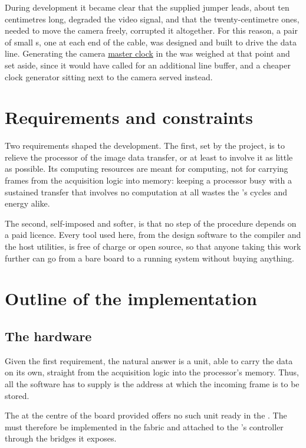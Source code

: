 During development it became clear that the supplied jumper leads, about ten centimetres long, degraded the video signal, and that the twenty-centimetre ones, needed to move the camera freely, corrupted it altogether. For this reason, a pair of small s, one at each end of the cable, was designed and built to drive the data line. Generating the camera \uline{master clock} in the  was weighed at that point and set aside, since it would have called for an additional line buffer, and a cheaper clock generator sitting next to the camera served instead.

\section{Requirements and constraints}

Two requirements shaped the development. The first, set by the project, is to relieve the processor of the image data transfer, or at least to involve it as little as possible. Its computing resources are meant for computing, not for carrying frames from the acquisition logic into memory: keeping a processor busy with a sustained transfer that involves no computation at all wastes the 's cycles and energy alike.

The second, self-imposed and softer, is that no step of the procedure depends on a paid licence. Every tool used here, from the  design software to the compiler and the host utilities, is free of charge or open source, so that anyone taking this work further can go from a bare board to a running system without buying anything.

\section{Outline of the implementation}

\subsection{The hardware}

Given the first requirement, the natural answer is a  unit, able to carry the data on its own, straight from the acquisition logic into the processor's  memory. Thus, all the software has to supply is the address at which the incoming frame is to be stored.

The  at the centre of the board provided offers no such unit ready in the . The  must therefore be implemented in the  fabric and attached to the 's  controller through the  bridges it exposes.

